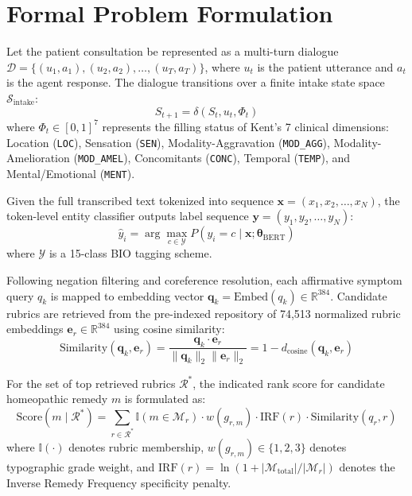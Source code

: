 \begin{sloppypar}
\section{Formal Problem Formulation}
Let the patient consultation be represented as a multi-turn dialogue $\mathcal{D} = \{(u_1, a_1), (u_2, a_2), \dots, (u_T, a_T)\}$, where $u_t$ is the patient utterance and $a_t$ is the agent response. The dialogue transitions over a finite intake state space $\mathcal{S}_{\text{intake}}$:
\begin{equation}
    S_{t+1} = \delta(S_t, u_t, \Phi_t)
\end{equation}
where $\Phi_t \in [0, 1]^7$ represents the filling status of Kent's 7 clinical dimensions: Location (\texttt{LOC}), Sensation (\texttt{SEN}), Modality-Aggravation (\texttt{MOD\_AGG}), Modality-Amelioration (\texttt{MOD\_AMEL}), Concomitants (\texttt{CONC}), Temporal (\texttt{TEMP}), and Mental/Emotional (\texttt{MENT}).

Given the full transcribed text tokenized into sequence $\mathbf{x} = (x_1, x_2, \dots, x_N)$, the token-level entity classifier outputs label sequence $\mathbf{y} = (y_1, y_2, \dots, y_N)$:
\begin{equation}
    \hat{y}_i = \arg\max_{c \in \mathcal{Y}} P(y_i = c \mid \mathbf{x}; \boldsymbol{\theta}_{\text{BERT}})
\end{equation}
where $\mathcal{Y}$ is a 15-class BIO tagging scheme.

Following negation filtering and coreference resolution, each affirmative symptom query $q_k$ is mapped to embedding vector $\mathbf{q}_k = \text{Embed}(q_k) \in \mathbb{R}^{384}$. Candidate rubrics are retrieved from the pre-indexed repository of 74,513 normalized rubric embeddings $\mathbf{e}_r \in \mathbb{R}^{384}$ using cosine similarity:
\begin{equation}
    \text{Similarity}(\mathbf{q}_k, \mathbf{e}_r) = \frac{\mathbf{q}_k \cdot \mathbf{e}_r}{\|\mathbf{q}_k\|_2 \|\mathbf{e}_r\|_2} = 1 - d_{\text{cosine}}(\mathbf{q}_k, \mathbf{e}_r)
\end{equation}

For the set of top retrieved rubrics $\mathcal{R}^*$, the indicated rank score for candidate homeopathic remedy $m$ is formulated as:
\begin{equation}
    \text{Score}(m \mid \mathcal{R}^*) = \sum_{r \in \mathcal{R}^*} \mathbb{I}(m \in \mathcal{M}_r) \cdot w(g_{r,m}) \cdot \text{IRF}(r) \cdot \text{Similarity}(q_r, r)
\end{equation}
where $\mathbb{I}(\cdot)$ denotes rubric membership, $w(g_{r,m}) \in \{1, 2, 3\}$ denotes typographic grade weight, and $\text{IRF}(r) = \ln(1 + |\mathcal{M}_{\text{total}}| / |\mathcal{M}_r|)$ denotes the Inverse Remedy Frequency specificity penalty.

\end{sloppypar}
